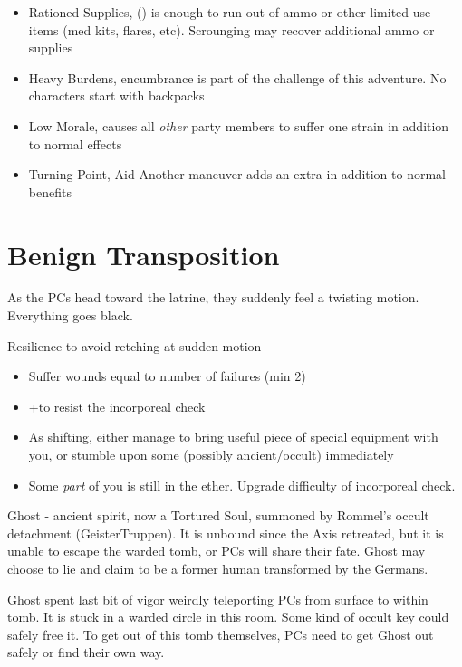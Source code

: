 \documentclass{book}
\newcommand{\df}{\DifficultyDie }
\newcommand{\ch}{\ChallengeDie }
\newcommand{\bbb}{\BoostDie }
\begin{document}
\begin{multicols}{2}
    \begin{itemize}
        \item Rationed Supplies, (\Threat\Threat) is enough to run out of ammo or other limited use items (med kits, flares, etc).  Scrounging may recover additional ammo or supplies
        \item Heavy Burdens, encumbrance is part of the challenge of this adventure.  No characters start with backpacks
        \item Low Morale, \Despair causes all \emph{other} party members to suffer one strain in addition to normal effects
        \item Turning Point, Aid Another maneuver adds an extra \Advantage\Advantage in addition to normal benefits
    \end{itemize}

\section{Benign Transposition}

As the PCs head toward the latrine, they suddenly feel a twisting motion.  Everything goes black.

\ch\df Resilience to avoid retching at sudden motion
    \begin{itemize}
        \item \Failure Suffer wounds equal to number of failures (min 2)
        \item \Advantage +\bbb to resist the incorporeal check
        \item \Triumph As shifting, either manage to bring useful piece of special equipment with you, or stumble upon some (possibly ancient/occult) immediately
        \item \Despair Some \emph{part} of you is still in the ether.  Upgrade difficulty of incorporeal check.
    \end{itemize}

    Ghost - ancient spirit, now a Tortured Soul, summoned by Rommel's occult detachment (GeisterTruppen).  It is unbound since the Axis retreated, but it is unable to escape the warded tomb, or PCs will share their fate.  Ghost may choose to lie and claim to be a former human transformed by the Germans.  

Ghost spent last bit of vigor weirdly teleporting PCs from surface to within tomb.  It is stuck in a warded circle in this room.  Some kind of occult key could safely free it.  To get out of this tomb themselves, PCs need to get Ghost out safely or find their own way.


\end{multicols}
\end{document}
